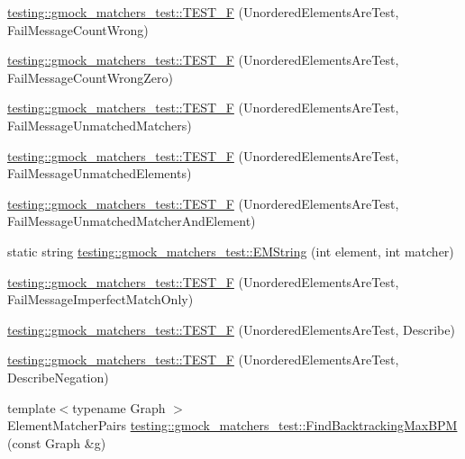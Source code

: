 \begin{DoxyCompactItemize}
\item 
\hyperlink{namespacetesting_1_1gmock__matchers__test_a5dd3b28b540c1ef01e623f840c48e7b4}{testing\+::gmock\+\_\+matchers\+\_\+test\+::\+T\+E\+S\+T\+\_\+F} (Unordered\+Elements\+Are\+Test, Fail\+Message\+Count\+Wrong)
\item 
\hyperlink{namespacetesting_1_1gmock__matchers__test_a7dc8c467fe0d6f26c0ee643be56eb590}{testing\+::gmock\+\_\+matchers\+\_\+test\+::\+T\+E\+S\+T\+\_\+F} (Unordered\+Elements\+Are\+Test, Fail\+Message\+Count\+Wrong\+Zero)
\item 
\hyperlink{namespacetesting_1_1gmock__matchers__test_a11b785087491ae58b074fa8dbbc88cd4}{testing\+::gmock\+\_\+matchers\+\_\+test\+::\+T\+E\+S\+T\+\_\+F} (Unordered\+Elements\+Are\+Test, Fail\+Message\+Unmatched\+Matchers)
\item 
\hyperlink{namespacetesting_1_1gmock__matchers__test_a6dfb50dcbb543de71fcc4d09844d36b3}{testing\+::gmock\+\_\+matchers\+\_\+test\+::\+T\+E\+S\+T\+\_\+F} (Unordered\+Elements\+Are\+Test, Fail\+Message\+Unmatched\+Elements)
\item 
\hyperlink{namespacetesting_1_1gmock__matchers__test_a2395b7e71b7ad50af72caa61c10e6898}{testing\+::gmock\+\_\+matchers\+\_\+test\+::\+T\+E\+S\+T\+\_\+F} (Unordered\+Elements\+Are\+Test, Fail\+Message\+Unmatched\+Matcher\+And\+Element)
\item 
static string \hyperlink{namespacetesting_1_1gmock__matchers__test_a5ec14aa1e31cb496e5366f583e29dfeb}{testing\+::gmock\+\_\+matchers\+\_\+test\+::\+E\+M\+String} (int element, int matcher)
\item 
\hyperlink{namespacetesting_1_1gmock__matchers__test_ac70f9f9717f35352349b076654094f6a}{testing\+::gmock\+\_\+matchers\+\_\+test\+::\+T\+E\+S\+T\+\_\+F} (Unordered\+Elements\+Are\+Test, Fail\+Message\+Imperfect\+Match\+Only)
\item 
\hyperlink{namespacetesting_1_1gmock__matchers__test_a937f4d835023cd6322eb7d32596f3f43}{testing\+::gmock\+\_\+matchers\+\_\+test\+::\+T\+E\+S\+T\+\_\+F} (Unordered\+Elements\+Are\+Test, Describe)
\item 
\hyperlink{namespacetesting_1_1gmock__matchers__test_a3c4c92b68a08c5d541e46ed367e216ab}{testing\+::gmock\+\_\+matchers\+\_\+test\+::\+T\+E\+S\+T\+\_\+F} (Unordered\+Elements\+Are\+Test, Describe\+Negation)
\item 
{\footnotesize template$<$typename Graph $>$ }\\Element\+Matcher\+Pairs \hyperlink{namespacetesting_1_1gmock__matchers__test_a09321a8d4a4c40ab1e369fbdf92b0414}{testing\+::gmock\+\_\+matchers\+\_\+test\+::\+Find\+Backtracking\+Max\+B\+PM} (const Graph \&g)

\end{DoxyCompactItemize}
